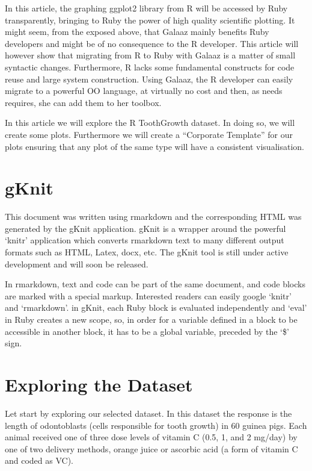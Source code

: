 \documentclass[]{article}
\begin{document}
In this article, the graphing ggplot2 library from R will be accessed by
Ruby transparently, bringing to Ruby the power of high quality
scientific plotting. It might seem, from the exposed above, that Galaaz
mainly benefits Ruby developers and might be of no consequence to the R
developer. This article will however show that migrating from R to Ruby
with Galaaz is a matter of small syntactic changes. Furthermore, R lacks
some fundamental constructs for code reuse and large system
construction. Using Galaaz, the R developer can easily migrate to a
powerful OO language, at virtually no cost and then, as needs requires,
she can add them to her toolbox.

In this article we will explore the R ToothGrowth dataset. In doing so,
we will create some plots. Furthermore we will create a ``Corporate
Template'' for our plots ensuring that any plot of the same type will
have a consistent visualisation.

\section{gKnit}\label{gknit}

This document was written using rmarkdown and the corresponding HTML was
generated by the gKnit application. gKnit is a wrapper around the
powerful `knitr' application which converts rmarkdown text to many
different output formats such as HTML, Latex, docx, etc. The gKnit tool
is still under active development and will soon be released.

In rmarkdown, text and code can be part of the same document, and code
blocks are marked with a special markup. Interested readers can easily
google `knitr' and `rmarkdown'. in gKnit, each Ruby block is evaluated
independently and `eval' in Ruby creates a new scope, so, in order for a
variable defined in a block to be accessible in another block, it has to
be a global variable, preceded by the `\$' sign.

\section{Exploring the Dataset}\label{exploring-the-dataset}

Let start by exploring our selected dataset. In this dataset the
response is the length of odontoblasts (cells responsible for tooth
growth) in 60 guinea pigs. Each animal received one of three dose levels
of vitamin C (0.5, 1, and 2 mg/day) by one of two delivery methods,
orange juice or ascorbic acid (a form of vitamin C and coded as VC).
\end{document}

